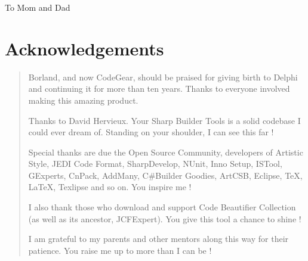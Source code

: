 \begin{center}
To Mom and Dad
\end{center}

\chapter*{Acknowledgements}
\begin{quote}
Borland, and now CodeGear, should be praised for giving birth to Delphi and
continuing it for more than ten years. Thanks to everyone involved making
this amazing product.

Thanks to David Hervieux. Your Sharp Builder Tools is a
solid codebase I could ever dream of. Standing on your shoulder, I can see this
far !

Special thanks are due the Open Source Community, developers of Artistic Style,
JEDI Code Format, SharpDevelop, NUnit, Inno
Setup, ISTool, GExperts, CnPack, AddMany, C\#Build\-er Goodies, ArtCSB,
Eclipse, \TeX, \LaTeX, Texlipse and so on. You inspire me !

I also thank those who download and support Code Beautifier Collection (as well
as its ancestor, JCFExpert). You give this tool a chance to shine !

I am grateful to my parents and other mentors along this way for their
patience. You raise me up to more than I can be !
\end{quote}
